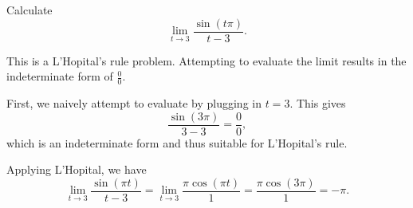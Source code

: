 \documentclass{ximera}
\author{Emma Smith Zbarsky}
\begin{document}
\begin{exercise}

Calculate \[\lim_{t \to 3} \frac{\sin(t\pi)}{t-3}.\]


\begin{hint}
This is a L'Hopital's rule problem. Attempting to evaluate the limit
results in the indeterminate form of $\frac{0}{0}$.
\end{hint}


\begin{hint}
First, we naively attempt to evaluate by plugging in $t=3$. This gives
\[\frac{\sin(3\pi)}{3-3} = \frac{0}{0},\] which is an indeterminate form
and thus suitable for L'Hopital's rule.

Applying L'Hopital, we have
\[\lim_{t\to 3}\frac{\sin(\pi t)}{t-3} = \lim_{t\to 3} \frac{\pi\cos(\pi t)}{1} = \frac{\pi\cos(3\pi)}{1} = -\pi.\]
\end{hint}


\begin{multipleChoice}
\choice{$\pi$}
\choice[correct]{$-\pi$}
\end{multipleChoice}

\end{exercise}
\end{document}
